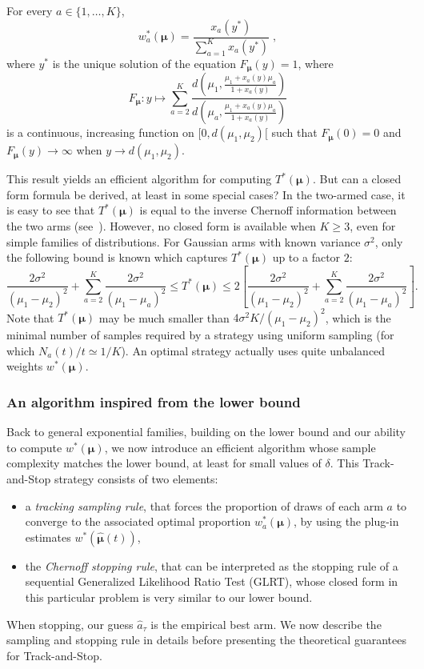 \documentclass[proc]{edpsmath}
\begin{document}
	
	\begin{lemma}\label{lem:ExplicitForm} For every $a\in\{1,\dots,K\}$, 
		\begin{equation}\label{eq:nuofx}
		w^*_a(\bm \mu) = \frac{x_a(y^*)}{\sum_{a=1}^Kx_a(y^*)}\;,\end{equation}
		where $y^*$ is the unique solution of the equation $F_{\bm\mu}(y)=1$, where
		\begin{equation}\label{eq:relation} F_{\bm\mu}:y\mapsto \sum_{a=2}^K \frac{d\left(\mu_1,\frac{\mu_1 + x_a(y)\mu_a}{1+x_a(y)}\right)}{d\left(\mu_a,\frac{\mu_1 + x_a(y)\mu_a}{1+x_a(y)}\right)} \end{equation}
		is a continuous, increasing function on $[0,d(\mu_1,\mu_2)[$ such that $F_{\bm\mu}(0)=0$ and $F_{\bm\mu}(y)\to \infty$ when $y\to d(\mu_1,\mu_2)$.
	\end{lemma}
	
	This result yields an efficient algorithm for computing $T^*(\bm\mu)$. But can a closed form formula be derived, at least in some special cases?
	In the two-armed case, it is easy to see that $T^*(\bm\mu)$ is equal to the inverse Chernoff information between the two arms (see~\cite{COLT14}). However, no closed form is available when $K\geq 3$, even for simple families of distributions. For Gaussian arms with known variance $\sigma^2$, only the following bound is known which captures $T^*(\bm\mu)$ up to a factor $2$:
	\[\frac{2\sigma^2}{(\mu_1-\mu_2)^2}+\sum_{a=2}^K \frac{2\sigma^2}{(\mu_1-\mu_a)^2} \leq T^*(\bm \mu) \leq 2 \left[\frac{2\sigma^2}{(\mu_1-\mu_2)^2}+\sum_{a=2}^K \frac{2\sigma^2}{(\mu_1-\mu_a)^2}\right].\]
	Note that $T^*(\bm \mu)$ may be much smaller than ${4\sigma^2 K}/{(\mu_1-\mu_2)^2}$, which is the minimal number of samples required by a strategy using uniform sampling (for which $N_a(t)/t \simeq 1/K$). An optimal strategy actually uses quite unbalanced weights $w^*(\bm \mu)$. 
	
	\subsubsection{An algorithm inspired from the lower bound}
	Back to general exponential families, building on the lower bound and our ability to compute $w^*(\bm\mu)$, we now introduce an efficient algorithm whose sample complexity matches the lower bound, at least for small values of $\delta$. This Track-and-Stop strategy consists of two elements: 
	\begin{itemize}
		\item a \emph{tracking sampling rule}, that forces the proportion of draws of each arm $a$ to converge to the associated optimal proportion $w_a^*(\bm\mu)$, by using the plug-in estimates $w^*(\hat{\bm\mu}(t))$,
		\item the \emph{Chernoff stopping rule}, that can be interpreted as the stopping rule of a sequential Generalized Likelihood Ratio Test (GLRT), whose closed form in this particular problem is very similar to our lower bound. 
	\end{itemize}
	When stopping, our guess $\hat{a}_\tau$ is the empirical best arm. We now describe the sampling and stopping rule in details before presenting the theoretical guarantees for Track-and-Stop. 
	
\end{document}
